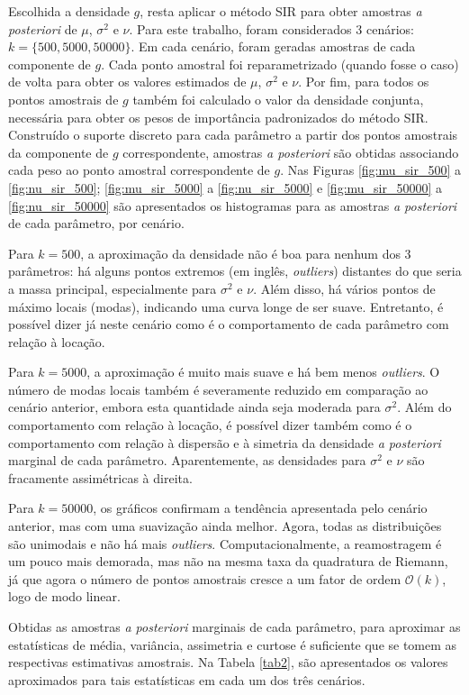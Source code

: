 Escolhida a densidade $g$, resta aplicar o método SIR para obter amostras \textit{a posteriori} de $\mu$, $\sigma^2$ e $\nu$. Para este trabalho, foram considerados 3 cenários: $k = \{500, 5000, 50000\}$. Em cada cenário, foram geradas amostras de cada componente de $g$. Cada ponto amostral foi reparametrizado (quando fosse o caso) de volta para obter os valores estimados de $\mu$, $\sigma^2$ e $\nu$. Por fim, para todos os pontos amostrais de $g$ também foi calculado o valor da densidade conjunta, necessária para obter os pesos de importância padronizados do método SIR. Construído o suporte discreto para cada parâmetro a partir dos pontos amostrais da componente de $g$ correspondente, amostras \textit{a posteriori} são obtidas associando cada peso ao ponto amostral correspondente de $g$. Nas Figuras \ref{fig:mu_sir_500} a \ref{fig:nu_sir_500}; \ref{fig:mu_sir_5000} a \ref{fig:nu_sir_5000} e \ref{fig:mu_sir_50000} a \ref{fig:nu_sir_50000} são apresentados os histogramas para as amostras \textit{a posteriori} de cada parâmetro, por cenário.

Para $k=500$, a aproximação da densidade não é boa para nenhum dos 3 parâmetros: há alguns pontos extremos (em inglês, \textit{outliers}) distantes do que seria a massa principal, especialmente para $\sigma^2$ e $\nu$. Além disso, há vários pontos de máximo locais (modas), indicando uma curva longe de ser suave. Entretanto, é possível dizer já neste cenário como é o comportamento de cada parâmetro com relação à locação.

Para $k=5000$, a aproximação é muito mais suave e há bem menos \textit{outliers}. O número de modas locais também é severamente reduzido em comparação ao cenário anterior, embora esta quantidade ainda seja moderada para $\sigma^2$. Além do comportamento com relação à locação, é possível dizer também como é o comportamento com relação à dispersão e à simetria da densidade \textit{a posteriori} marginal de cada parâmetro. Aparentemente, as densidades para $\sigma^2$ e $\nu$ são fracamente assimétricas à direita.

Para $k=50000$, os gráficos confirmam a tendência apresentada pelo cenário anterior, mas com uma suavização ainda melhor. Agora, todas as distribuições são unimodais e não há mais \textit{outliers}. Computacionalmente, a reamostragem é um pouco mais demorada, mas não na mesma taxa da quadratura de Riemann, já que agora o número de pontos amostrais cresce a um fator de ordem $\mathcal{O}(k)$, logo de modo linear.

Obtidas as amostras \textit{a posteriori} marginais de cada parâmetro, para aproximar as estatísticas de média, variância, assimetria e curtose é suficiente que se tomem as respectivas estimativas amostrais. Na Tabela \ref{tab2}, são apresentados os valores aproximados para tais estatísticas em cada um dos três cenários.

